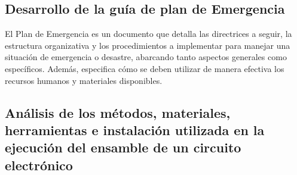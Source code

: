     \subsection{Desarrollo de la guía de plan de Emergencia}
    
    El Plan de Emergencia es un documento que detalla las directrices a seguir, la estructura organizativa y los procedimientos a implementar para manejar una situación de emergencia o desastre, abarcando tanto aspectos generales como específicos. Además, especifica cómo se deben utilizar de manera efectiva los recursos humanos y materiales disponibles.
    \subsection{Análisis de los métodos, materiales, herramientas e instalación utilizada en la ejecución del ensamble de un circuito electrónico}
    
